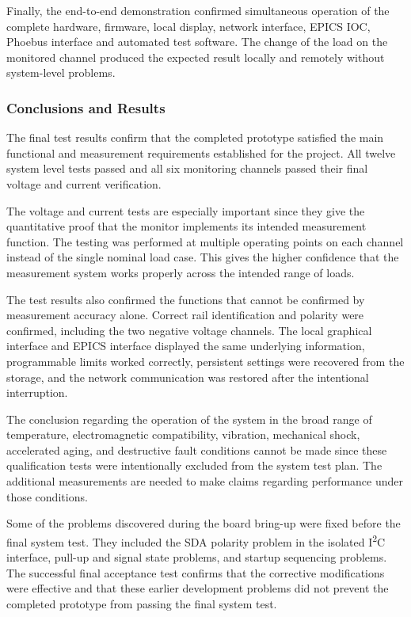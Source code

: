 Finally, the end-to-end demonstration confirmed simultaneous operation of the complete hardware, firmware, local display, network interface, EPICS IOC, Phoebus interface and automated test software. The change of the load on the monitored channel produced the expected result locally and remotely without system-level problems.

\subsubsection{Conclusions and Results}

The final test results confirm that the completed prototype satisfied the main functional and measurement requirements established for the project. All twelve system level tests passed and all six monitoring channels passed their final voltage and current verification.

The voltage and current tests are especially important since they give the quantitative proof that the monitor implements its intended measurement function. The testing was performed at multiple operating points on each channel instead of the single nominal load case. This gives the higher confidence that the measurement system works properly across the intended range of loads.

The test results also confirmed the functions that cannot be confirmed by measurement accuracy alone. Correct rail identification and polarity were confirmed, including the two negative voltage channels. The local graphical interface and EPICS interface displayed the same underlying information, programmable limits worked correctly, persistent settings were recovered from the storage, and the network communication was restored after the intentional interruption.

The conclusion regarding the operation of the system in the broad range of temperature, electromagnetic compatibility, vibration, mechanical shock, accelerated aging, and destructive fault conditions cannot be made since these qualification tests were intentionally excluded from the system test plan. The additional measurements are needed to make claims regarding performance under those conditions.

Some of the problems discovered during the board bring-up were fixed before the final system test. They included the SDA polarity problem in the isolated I\textsuperscript{2}C interface, pull-up and signal state problems, and startup sequencing problems. The successful final acceptance test confirms that the corrective modifications were effective and that these earlier development problems did not prevent the completed prototype from passing the final system test.

